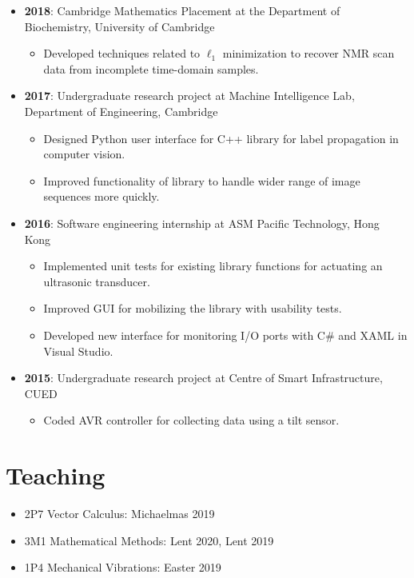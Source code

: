 \documentclass[letterpaper,11pt,oneside]{article}
\begin{document}
\begin{itemize}
\item \textbf{2018}: Cambridge Mathematics Placement at the Department of Biochemistry, University of Cambridge
\begin{itemize}
\item Developed techniques related to $\ell_1$ minimization to recover NMR scan data from incomplete time-domain samples.
\end{itemize}
\item \textbf{2017}: Undergraduate research project at Machine Intelligence Lab, Department of Engineering, Cambridge
\begin{itemize}
\item Designed Python user interface for C++ library for label propagation in computer vision.
\item Improved functionality of library to handle wider range of image sequences more quickly.
\end{itemize}
\item \textbf{2016}: Software engineering internship at ASM Pacific Technology, Hong Kong
\begin{itemize}
\item Implemented unit tests for existing library functions for actuating an ultrasonic transducer.
\item Improved GUI for mobilizing the library with usability tests.
\item Developed new interface for monitoring I/O ports with C\# and XAML in Visual Studio.
\end{itemize}
\item \textbf{2015}: Undergraduate research project at Centre of Smart Infrastructure, CUED
\begin{itemize}
\item Coded AVR controller for collecting data using a tilt sensor.
\end{itemize}

\end{itemize}

\section*{Teaching}
\begin{itemize}
\item 2P7 Vector Calculus: Michaelmas 2019
\item 3M1 Mathematical Methods: Lent 2020, Lent 2019
\item 1P4 Mechanical Vibrations: Easter 2019
\end{itemize}
\end{document}

